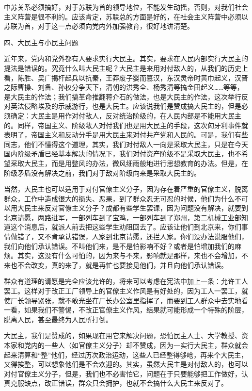 中苏关系必须搞好，对于苏联为首的领导地位，不能发生动摇，否则，对我们社会主义阵营是很不利的。应该肯定，苏联总的方面是好的，在社会主义阵营中必须以苏联为首，对于这一点必须向党内外加强教育，很好地讲清楚。

四、大民主与小民主问题

近年来，党内和党外都有人要求实行大民主。其实，要求在人民内部实行大民主的提法是错误的。究竟什么叫大民主呢？大民主是来用对付敌人的，从我们的历史上看，陈胜、吴广揭杆起兵以抗秦，王莽废子婴而篡汉，东汉灵帝时黄巾起义，汉晋之际曹操、刘备、孙权分争天下，清朝的洪秀全、杨秀清等搞金田起义……等等，是大民主的作法；我们搞革命推翻蒋介石的做法，也是大民主的作法，这次举行反对英法侵略埃及的示威游行，也是大民主。应该说我们是赞成搞大民主的，但是必须确定：大民主是用作对付敌人，反对统治阶级的，在人民内部是不能用大民主的。同样，帝国主义、阶级敌人对付我们也是用大民主的手段，这次匈牙利事件就表明了，帝国主义和反动分手是用大民主来对付共产党和人民的。可是，我们有些同志，他们不懂得这个道理，其实，我们对付敌人一向是采取大民主，只是在今天国内阶级矛盾已经基本解决的情况下，我们对付资产阶级不是采取大民主，也不希望采取大民主，而是用整风的办法，微风细雨般地进行思想教育的办法。但是，在阶级矛盾没有解决之前，我们对于敌对阶级向来是采取大民主的。

当然，大民主也可以适用于对付官僚主义分子，因为存在着严重的官僚主义，脱离群众，工作中造成很大的损失、恶果，到了群众忍无可忍的时候，他们为什么不可以用大民主来反对官僚主义分子？成都有些学生罢课，因为问题没有解决，就要到北京请愿，两路进军，一部列车到了宝鸡，一部列车到了郑州，第二机械工业部知道这个消息后，就派人前去把这些学生劝阻回去了。应该让他们到北京来，你们事情做错了，又不肯承认错误，人家到北京请愿，还拦人家。你们没办法说服他们，我们向他们承认错误。不叫他们来，是不是怕影响不好？或者是怕增加我们的麻烦。其实，这没有什么可怕的，因为来与不来，影响就是那样，来也不会增加，不来也不会改变，真的来了，就是再忙也要接见他们，并且向他们承认错误。

群众有道理的请愿是完全应该允许的，将来可以考虑在宪法中加上一条：允许工人罢工。这样对于改正工厂领导上的官僚主义作风是有好处的，因为工人一罢工，就使厂长领导紧张，就不敢光坐在厂长办公室里指挥了，而要到工人群众中去实地看一看，如果我们不警惕，不改正官僚主义作风，结果就可能形成一个特殊的阶层，脱离人民，甚至最终为人民所打倒。

大民主，我们是赞成的，如果现在用它来解决问题，恐怕民主人士、大学教授、资本家和党内的一些人（如官僚主义分子）却不赞成，因为一实行大民主，群众就会起来清算和“整”他们，经过历次政治运动，这些人已经整得够呛，再来个大民主，又得挨整，可以想象他们是不会欢迎的。其实，虽然大民主是对付敌人的，也可以对付官僚主义分子，但是，我们也不必害怕它，问题在于只要能够把工作做好，认真克服缺点，改正错误，群众只会拥护，也就不会搞什么大民主来反对了。

